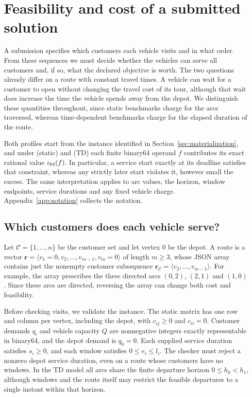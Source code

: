 \section{Feasibility and cost of a submitted solution}\label{sec:exact}\label{sec:profiles}

A submission specifies which customers each vehicle visits and in what order. From these sequences we must decide whether the vehicles can serve all customers and, if so, what the declared objective is worth. The two questions already differ on a route with constant travel times. A vehicle can wait for a customer to open without changing the travel cost of its tour, although that wait does increase the time the vehicle spends away from the depot. We distinguish these quantities throughout, since static benchmarks charge for the arcs traversed, whereas time-dependent benchmarks charge for the elapsed duration of the route.

Both profiles start from the instance identified in Section~\ref{sec:materialization}, and under  (static) and  (TD) each finite binary64 operand $f$ contributes its exact rational value $\iota_{64}(f)$. In particular, a service start exactly at its deadline satisfies that constraint, whereas any strictly later start violates it, however small the excess. The same interpretation applies to arc values, the horizon, window endpoints, service durations and any fixed vehicle charge. Appendix~\ref{app:notation} collects the notation.

\subsection{Which customers does each vehicle serve?}

Let $\mathcal C=\{1,\ldots,n\}$ be the customer set and let vertex $0$ be the depot. A route is a vector $\mathbf r=\langle v_1=0,v_2,\ldots,v_{m-1},v_m=0\rangle$ of length $m\geq3$, whose JSON array contains just the nonempty customer subsequence $\mathbf r_{\mathcal C}=\langle v_2,\ldots,v_{m-1}\rangle$. For example, the array \id{[2,1]} prescribes the three directed arcs $(0,2)$, $(2,1)$ and $(1,0)$. Since these arcs are directed, reversing the array can change both cost and feasibility.

Before checking visits, we validate the instance. The static matrix has one row and column per vertex, including the depot, with $c_{ij}\geq0$ and $c_{ii}=0$. Customer demands $q_i$ and vehicle capacity $Q$ are nonnegative integers exactly representable in binary64, and the depot demand is $q_0=0$. Each supplied service duration satisfies $s_i\geq0$, and each window satisfies $0\leq e_i\leq l_i$. The checker must reject a nonzero depot service duration, even on a route whose customers have no windows. In the TD model all arcs share the finite departure horizon $0\leq h_0<h_1$, although windows and the route itself may restrict the feasible departures to a single instant within that horizon.

